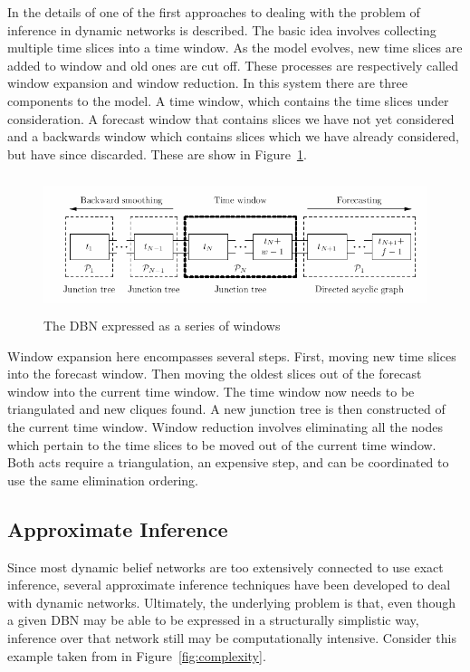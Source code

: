 \documentclass{article}
\begin{document}
In \cite{uk:dhugin} the details of one of the first approaches to dealing with the problem of inference in dynamic networks is described. The basic idea involves collecting multiple time slices into a time window. As the model evolves, new time slices are added to window and old ones are cut off. These processes are respectively called window expansion and window reduction. In this system there are three components to the model. A time window, which contains the time slices under consideration. A forecast window that contains slices we have not yet considered and a backwards window which contains slices which we have already considered, but have since discarded. These are show in Figure~\ref{fig:timewindow}. 

\begin{figure}[h]
\begin{center}
\includegraphics[height=40mm]{figures/timewindow.png}
\caption{The DBN expressed as a series of windows}
\label{fig:timewindow}
\end{center}
\end{figure}

Window expansion here encompasses several steps. First, moving new time slices into the forecast window. Then moving the oldest slices out of the forecast window into the current time window. The time window now needs to be triangulated and new cliques found. A new junction tree is then constructed of the current time window. Window reduction involves eliminating all the nodes which pertain to the time slices to be moved out of the current time window. Both acts require a triangulation, an expensive step, and can be coordinated to use the same elimination ordering. 

\subsection{Approximate Inference}
Since most dynamic belief networks are too extensively connected to use exact inference, several approximate inference techniques have been developed to deal with dynamic networks. Ultimately, the underlying problem is that, even though a given DBN may be able to be expressed in a structurally simplistic way, inference over that network still may be computationally intensive. Consider this example taken from \cite{boyentractable} in Figure~\ref{fig:complexity}.
\end{document}
